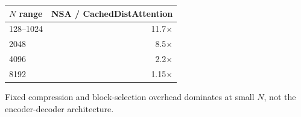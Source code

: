 \begin{frame}
  \centering
  \small
  \renewcommand{\arraystretch}{1.35}
  \begin{tabular}{@{}lr@{}}
    \toprule
    $N$ range & NSA / CachedDistAttention\\
    \midrule
    128--1024 & 11.7$\times$\\
    2048 & 8.5$\times$\\
    4096 & 2.2$\times$\\
    8192 & 1.15$\times$\\
    \bottomrule
  \end{tabular}
  \vspace{4mm}

  {\footnotesize Fixed compression and block-selection overhead dominates at small $N$, not the encoder-decoder architecture.\par}
\end{frame}
